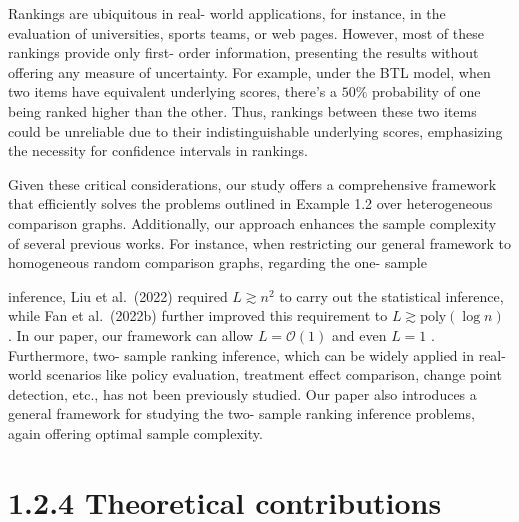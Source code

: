 Rankings are ubiquitous in real- world applications, for instance, in
the evaluation of universities, sports teams, or web pages. However,
most of these rankings provide only first- order information, presenting
the results without offering any measure of uncertainty. For example,
under the BTL model, when two items have equivalent underlying scores,
there's a \(50\%\) probability of one being ranked higher than the
other. Thus, rankings between these two items could be unreliable due to
their indistinguishable underlying scores, emphasizing the necessity for
confidence intervals in rankings.

Given these critical considerations, our study offers a comprehensive
framework that efficiently solves the problems outlined in Example 1.2
over heterogeneous comparison graphs. Additionally, our approach
enhances the sample complexity of several previous works. For instance,
when restricting our general framework to homogeneous random comparison
graphs, regarding the one- sample

inference, Liu et al.~(2022) required \(L \gtrsim n^2\) to carry out the
statistical inference, while Fan et al.~(2022b) further improved this
requirement to \(L \gtrsim \mathrm{poly}(\log n)\) . In our paper, our
framework can allow \(L = \mathcal{O}(1)\) and even \(L = 1\) .
Furthermore, two- sample ranking inference, which can be widely applied
in real- world scenarios like policy evaluation, treatment effect
comparison, change point detection, etc., has not been previously
studied. Our paper also introduces a general framework for studying the
two- sample ranking inference problems, again offering optimal sample
complexity.

\section{1.2.4 Theoretical
contributions}\label{theoretical-contributions}

